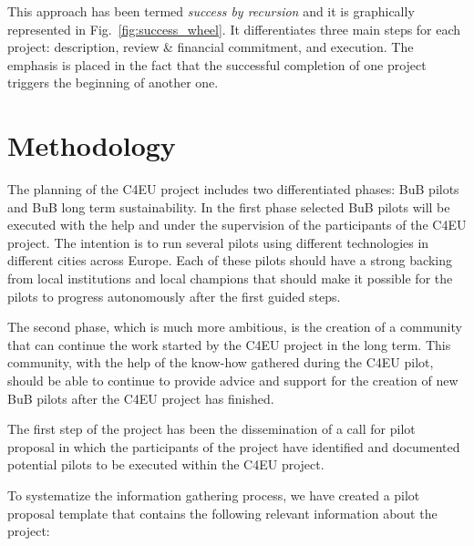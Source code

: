 \documentclass[conference]{IEEEtran}
\begin{document}
This approach has been termed \emph{success by recursion} and it is graphically represented in Fig.~\ref{fig:success_wheel}.
It differentiates three main steps for each project: description, review \& financial commitment, and execution.
The emphasis is placed in the fact that the successful completion of one project triggers the beginning of another one.

\section{Methodology}
\label{sec:methodology}

The planning of the C4EU project includes two differentiated phases: BuB pilots and BuB long term sustainability.
In the first phase selected BuB pilots will be executed with the help and under the supervision of the participants of the C4EU project.
The intention is to run several pilots using different technologies in different cities across Europe.
Each of these pilots should have a strong backing from local institutions and local champions that should make it possible for the pilots to progress autonomously after the first guided steps.

The second phase, which is much more ambitious, is the creation of a community that can continue the work started by the C4EU project in the long term.
This community, with the help of the know-how gathered during the C4EU pilot, should be able to continue to provide advice and support for the creation of new BuB pilots after the C4EU project has finished.

The first step of the project has been the dissemination of a call for pilot proposal in which the participants of the project have identified and documented potential pilots to be executed within the C4EU project.

To systematize the information gathering process, we have created a pilot proposal template that contains the following relevant information about the project:
\end{document}
